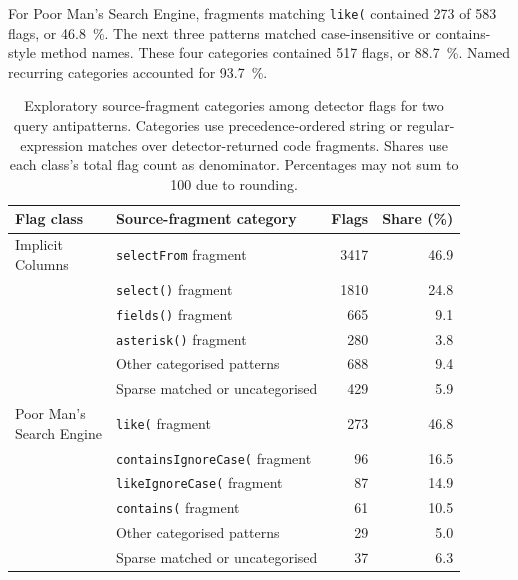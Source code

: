 For Poor Man's Search Engine, fragments matching \texttt{like(} contained \num{273} of \num{583} flags, or \qty{46.8}{\percent}. The next three patterns matched case-insensitive or contains-style method names. These four categories contained \num{517} flags, or \qty{88.7}{\percent}. Named recurring categories accounted for \qty{93.7}{\percent}.

\begin{table}[H]
    \centering
    \small
    \caption{Exploratory source-fragment categories among detector flags for two query antipatterns. Categories use precedence-ordered string or regular-expression matches over detector-returned code fragments. Shares use each class's total flag count as denominator. Percentages may not sum to 100 due to rounding.}
    \label{tab:apiManifestations}
    \begin{tabular}{p{2.2cm}p{5.3cm}rr}
        \hline
        \textbf{Flag class} & \textbf{Source-fragment category} & \textbf{Flags} & \textbf{Share (\%)} \\
        \hline
        \makecell[l]{Implicit\\Columns} & \texttt{selectFrom} fragment & 3417 & 46.9 \\
        & \texttt{select()} fragment & 1810 & 24.8 \\
        & \texttt{fields()} fragment & 665 & 9.1 \\
        & \texttt{asterisk()} fragment & 280 & 3.8 \\
        & Other categorised patterns & 688 & 9.4 \\
        & Sparse matched or uncategorised & 429 & 5.9 \\
        \hline
        \makecell[l]{Poor Man's\\Search Engine} & \texttt{like(} fragment & 273 & 46.8 \\
        & \texttt{containsIgnoreCase(} fragment & 96 & 16.5 \\
        & \texttt{likeIgnoreCase(} fragment & 87 & 14.9 \\
        & \texttt{contains(} fragment & 61 & 10.5 \\
        & Other categorised patterns & 29 & 5.0 \\
        & Sparse matched or uncategorised & 37 & 6.3 \\
        \hline
    \end{tabular}
\end{table}
